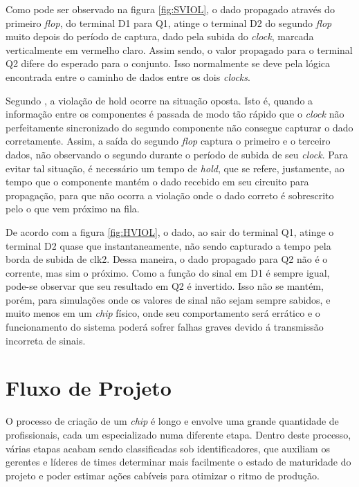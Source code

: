 \documentclass[
	12pt,				%
    oneside,			%
	a4paper,			%
	english,			%
	french,				%
	spanish,			%
	brazil				%
	]{abntex2}
\begin{document}
Como pode ser observado na figura \ref{fig:SVIOL}, o dado propagado através do primeiro \textit{flop}, do terminal D1 para Q1, atinge o terminal D2 do segundo \textit{flop} muito depois do período de captura, dado pela subida do \textit{clock}, marcada verticalmente em vermelho claro. Assim sendo, o valor propagado para o terminal Q2 difere do esperado para o conjunto. Isso normalmente se deve pela lógica encontrada entre o caminho de dados entre os dois \textit{clocks}.

Segundo \citeauthor{Greg}, a violação de hold ocorre na situação oposta. Isto é, quando a informação entre os componentes é passada de modo tão rápido que o \textit{clock} não perfeitamente sincronizado do segundo componente não consegue capturar o dado corretamente. Assim, a saída do segundo \textit{flop} captura o primeiro e o terceiro dados, não observando o segundo durante o período de subida de seu \textit{clock}. Para evitar tal situação, é necessário um tempo de \textit{hold}, que se refere, justamente, ao tempo que o componente mantém o dado recebido em seu circuito para propagação, para que não ocorra a violação onde o dado correto é sobrescrito pelo o que vem próximo na fila.



De acordo com a figura \ref{fig:HVIOL}, o dado, ao sair do terminal Q1, atinge o terminal D2 quase que instantaneamente, não sendo capturado a tempo pela borda de subida de clk2. Dessa maneira, o dado propagado para Q2 não é o corrente, mas sim o próximo. Como a função do sinal em D1 é sempre igual, pode-se observar que seu resultado em Q2 é invertido. Isso não se mantém, porém, para simulações onde os valores de sinal não sejam sempre sabidos, e muito menos em um \textit{chip} físico, onde seu comportamento será errático e o funcionamento do sistema poderá sofrer falhas graves devido á transmissão incorreta de sinais.

\section{Fluxo de Projeto}

O processo de criação de um \textit{chip} é longo e envolve uma grande quantidade de profissionais, cada um especializado numa diferente etapa. Dentro deste processo, várias etapas acabam sendo classificadas sob identificadores, que auxiliam os gerentes e líderes de times determinar mais facilmente o estado de maturidade do projeto e poder estimar ações cabíveis para otimizar o ritmo de produção.
\end{document}
